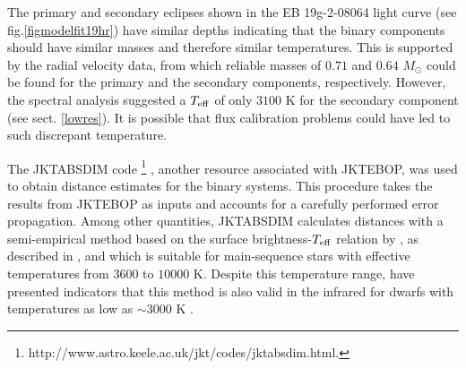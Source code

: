 \documentclass[fleqn,usenatbib]{mnras}
\begin{document}

The primary and secondary eclipses shown in the EB 19g-2-08064 light curve (see fig.\ref{figmodelfit19hr}) have similar depths indicating that the binary components should have similar masses and therefore similar temperatures. This is supported by the radial velocity data, from which reliable masses of $0.71$ and $0.64$ $M_{\odot}$ could be found for the primary and the secondary components, respectively. However, the spectral analysis suggested a $T_{\rm eff}$ of only $3100$ K for the secondary component (see sect. \ref{lowres}). It is possible that flux calibration problems could have led to such discrepant temperature.

The JKTABSDIM code \footnote{http://www.astro.keele.ac.uk/jkt/codes/jktabsdim.html.} \citep{Southworth05}, another resource associated with JKTEBOP, was used to obtain distance estimates for the binary systems. This procedure takes the results from JKTEBOP as inputs and accounts for a carefully performed error propagation. Among other quantities, JKTABSDIM calculates distances with a semi-empirical method based on the surface brightness-$T_{\rm eff}$ relation by \citet{Kervella04}, as described in \citet{Southworth05}, and which is suitable for main-sequence stars with effective temperatures from $3600$ to $10000$ K. Despite this temperature range, \citet{Kervella04} have presented indicators that this method is also valid in the infrared for dwarfs with temperatures as low as $\sim$$3000$ K \citep[][fig. 3]{Kervella04}.
\end{document}
